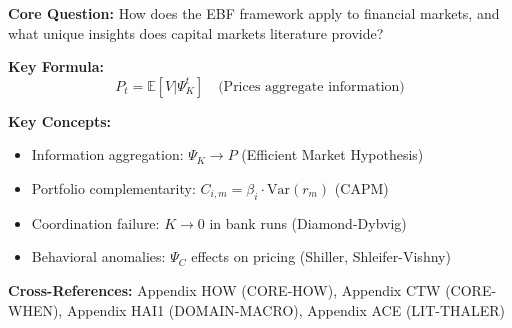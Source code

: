 
\begin{abstract}
This appendix demonstrates how the EBF framework $(C, \Psi, C^*, K, Q)$ operates
in financial market contexts. Financial markets provide unique testing grounds:
rapid information aggregation ($\Psi_K \to P$), explicit complementarity structures
($C_{ij}^{portfolio}$ as covariances), coordination failures ($K \to 0$ in crises),
and measurable outcomes ($Q$ as returns, volatility, welfare). We integrate
20 foundational papers spanning efficient markets, asset pricing, behavioral
finance, corporate finance, banking crises, and derivatives. The synthesis
reveals how EBF unifies diverse financial phenomena under a common framework.
\end{abstract}

\begin{tcolorbox}[colback=blue!5!white, colframe=blue!75!black,
    title=Quick Reference: Capital Markets]

\textbf{Core Question:} How does the EBF framework apply to financial markets,
and what unique insights does capital markets literature provide?

\textbf{Key Formula:}
\begin{equation}
P_t = \mathbb{E}[V | \Psi_K^t] \quad \text{(Prices aggregate information)}
\end{equation}

\textbf{Key Concepts:}
\begin{itemize}[nosep]
\item Information aggregation: $\Psi_K \to P$ (Efficient Market Hypothesis)
\item Portfolio complementarity: $C_{i,m} = \beta_i \cdot \text{Var}(r_m)$ (CAPM)
\item Coordination failure: $K \to 0$ in bank runs (Diamond-Dybvig)
\item Behavioral anomalies: $\Psi_C$ effects on pricing (Shiller, Shleifer-Vishny)
\end{itemize}

\textbf{Cross-References:} Appendix HOW (CORE-HOW), Appendix CTW (CORE-WHEN),
Appendix HAI1 (DOMAIN-MACRO), Appendix ACE (LIT-THALER)
\end{tcolorbox}



